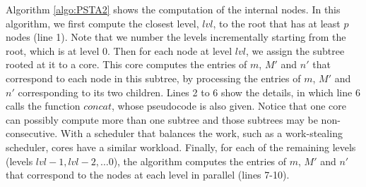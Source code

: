 Algorithm \ref{algo:PSTA2} shows the computation of the internal nodes.
In this algorithm, we first compute the closest
level, $lvl$, to the root that has at least $p$ nodes (line 1).
Note that we number the levels incrementally starting from the root, which is at level $0$.
Then for each node at level $lvl$, we assign the subtree rooted at it to a core.
This core computes the entries of $m$, $M'$ and $n'$ that correspond to each node in this subtree, by processing the entries of $m$, $M'$ and $n'$ corresponding to its two children.
Lines 2 to 6 show the details, in which line 6 calls the function $concat$, whose pseudocode is also given.
Notice that one core can possibly compute
more than one subtree and those subtrees may be non-consecutive. With
a scheduler that balances the work, such as a work-stealing scheduler, cores have a similar workload.
Finally, for each of the remaining levels (levels $lvl-1, lvl-2, \ldots 0$), the algorithm computes the entries of $m$, $M'$ and $n'$ that correspond to the nodes at each level in parallel (lines 7-10). 

